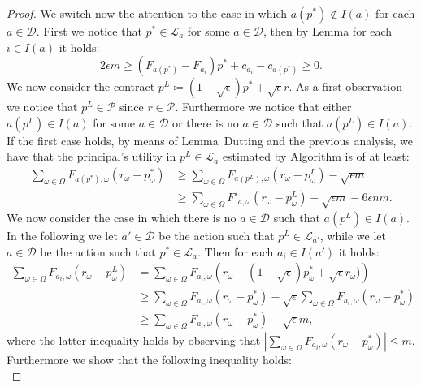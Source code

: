 \begin{proof}
    We switch now the attention to the case in which $a(p^*) \not \in I(a)$ for each $a \in \mathcal{D}$. First we notice that $p^* \in \mathcal{L}_{a}$ for some $a \in \mathcal{D}$, then by Lemma for each $i \in I(a)$ it holds:
    \begin{equation*}
       2 \epsilon m \ge (F_{a(p^*)}-F_{a_{i}}) p^* + c_{a_i}- c_{a(p^*)} \ge 0.
    \end{equation*}
    We now consider the contract $p^{L} \coloneqq (1-\sqrt{\epsilon})p^*  + \sqrt{\epsilon} r$. As a first observation we notice that $p^L \in \mathcal{P}$ since $r \in \mathcal{P}$. Furthermore we notice that either $a(p^L) \in I(a)$ for some $a \in \mathcal{D}$ or there is no $a \in \mathcal{D}$ such that $a(p^L) \in I(a)$. If the first case holds, by means of Lemma~Dutting and the previous analysis, we have that the principal's utility in $p^L \in \mathcal{L}_{a}$ estimated by Algorithm is of at least:
    \begin{align*}
        \sum_{\omega \in \Omega} F_{a(p^*), \omega} \left( r_\omega - p^*_\omega \right)
        & \ge  \sum_{\omega \in \Omega} F_{a(p^L), \omega} \left( r_\omega - p^L_\omega \right)  -\sqrt{ \epsilon m}\\
        & \ge  \sum_{\omega \in \Omega} F'_{a, \omega} \left( r_\omega - p^L_\omega \right)  -\sqrt{ \epsilon m}- 6 \epsilon n m .
    \end{align*}
    We now consider the case in which there is no $a \in \mathcal{D}$ such that $a(p^L) \in I(a)$. In the following we let $a' \in \mathcal{D}$ be the action such that $p^L \in \mathcal{L}_{a'}$, while we let $a \in \mathcal{D}$ be the action such that $p^* \in \mathcal{L}_{a}$. Then for each $a_i \in I(a')$ it holds: 
    \begin{align*}
        \sum_{\omega \in \Omega} F_{a_i, \omega} \left( r_\omega - p^L_\omega \right)
        & =  \sum_{\omega \in \Omega} F_{a_i, \omega} \left( r_\omega - (1-\sqrt{\epsilon}) p_\omega^* + \sqrt{\epsilon} r_\omega ) \right) \\
        & \ge  \sum_{\omega \in \Omega} F_{a_i, \omega} \left( r_\omega - p^*_\omega \right)  -\sqrt{ \epsilon} \sum_{\omega \in \Omega} F_{a_i, \omega} \left( r_\omega - p^*_\omega \right)\\
        & \ge  \sum_{\omega \in \Omega} F_{a_i, \omega} \left( r_\omega - p^*_\omega \right)  -\sqrt{ \epsilon} m,
    \end{align*}
     where the latter inequality holds by observing that $|\sum_{\omega \in \Omega} F_{a_i, \omega} \left( r_\omega - p^*_\omega \right)| \le m $. Furthermore we show that the following inequality holds:\\

\end{proof}
